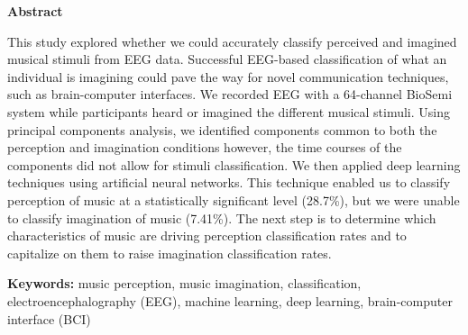 \begin{preliminary}
\maketitle
{}
\makecert
\newpage
{}
\Large\begin{center}\textbf{Abstract}\end{center}\normalsize
\begin{spacing}{2}
This study explored whether we could accurately classify perceived and imagined musical stimuli from EEG data. 
Successful EEG-based classification of what an individual is imagining could pave the way for novel communication techniques, such as brain-computer interfaces. 
We recorded EEG with a 64-channel BioSemi system while participants heard or imagined the different musical stimuli. 
Using principal components analysis, we identified components common to both the perception and imagination conditions however, the time courses of the components did not allow for stimuli classification. 
We then applied deep learning techniques using artificial neural networks. 
This technique enabled us to classify perception of music at a statistically significant level (28.7\%), but we were unable to classify imagination of music (7.41\%). 
The next step is to determine which characteristics of music are driving perception classification rates and to capitalize on them to raise imagination classification rates. 
\end{spacing}
\vfill
\textbf{Keywords:} music perception, music imagination, classification, electroencephalography (EEG), machine learning, deep learning, brain-computer interface (BCI)
\newpage
{}
\acknowledge{\makeacknowledge}	%
\newpage
\tableofcontents
\newpage
{}
\listoffigures
\newpage
{}
\listoftables\newpage
{}
\listofmyappendices\newpage
\cleardoublepage
\end{preliminary}